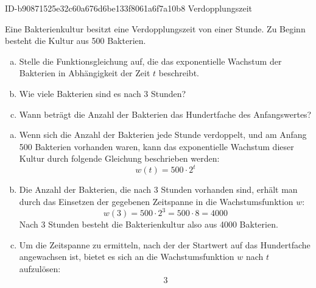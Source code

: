 \begin{exercise}
      {ID-b90871525e32c60a676d6be133f8061a6f7a10b8}
      {Verdopplungszeit}
  \ifproblem\problem\par
    Eine Bakterienkultur besitzt eine Verdopplungszeit
    von einer Stunde.
    Zu Beginn besteht die Kultur aus \num{500}
    Bakterien.
    \begin{enumerate}[a)]
      \item Stelle die Funktionsgleichung auf,
            die das exponentielle Wachstum der
            Bakterien in Abhängigkeit der Zeit
            $t$ beschreibt.
      \item Wie viele Bakterien sind es nach \num{3} Stunden?
      \item Wann beträgt die Anzahl der Bakterien das
            Hundertfache des Anfangswertes?
    \end{enumerate}
  \fi
  \ifoutcome\outcome
    \begin{enumerate}[a)]
      \item Wenn sich die Anzahl der Bakterien
            jede Stunde verdoppelt, und am
            Anfang \num{500} Bakterien
            vorhanden waren, kann das
            exponentielle Wachstum dieser
            Kultur durch folgende Gleichung
            beschrieben werden:
            \begin{equation*}
              w(t)=\num{500}\cdot2^t
            \end{equation*}
      \item Die Anzahl der Bakterien, die nach \num{3}
            Stunden vorhanden sind, erhält man durch
            das Einsetzen der gegebenen Zeitspanne in
            die Wachstumsfunktion $w$:
            \begin{equation*}
              w(3)=\num{500}\cdot2^3
                  =\num{500}\cdot8
                  =\num{4000}
            \end{equation*}
            Nach \num{3} Stunden besteht die
            Bakterienkultur also aus \num{4000}
            Bakterien.
      \item Um die Zeitspanne zu ermitteln, nach
            der der Startwert auf das Hundertfache
            angewachsen ist, bietet es sich an
            die Wachstumsfunktion $w$ nach $t$
            aufzulösen:
            \begin{alignat*}{3}

\end{alignat*}
\end{enumerate}
\end{exercise}
